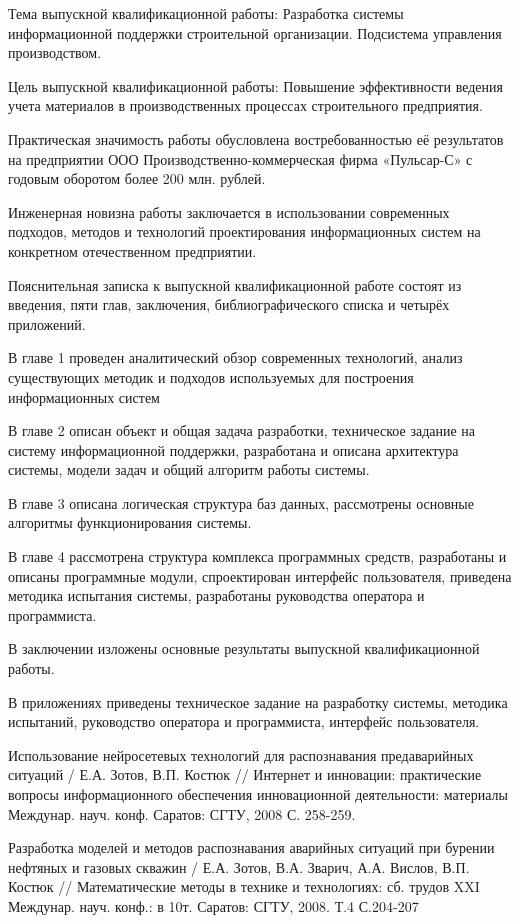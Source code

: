 \documentclass[a4paper,13pt]{article}
\begin{document}
Тема выпускной квалификационной работы:  Разработка системы информационной поддержки строительной организации. Подсистема управления производством.

Цель выпускной квалификационной работы: Повышение эффективности ведения учета материалов в производственных процессах строительного предприятия. 

Практическая значимость работы обусловлена востребованностью её результатов на предприятии ООО Производственно-коммерческая фирма «Пульсар-С» с годовым оборотом более 200 млн. рублей.

Инженерная новизна работы заключается в использовании современных подходов, методов и технологий проектирования информационных систем на конкретном отечественном предприятии.

Пояснительная записка к выпускной квалификационной работе состоят из введения, пяти глав, заключения, библиографического списка и четырёх приложений.

В главе 1 проведен аналитический обзор современных технологий, анализ существующих методик и подходов используемых для построения информационных систем

В главе 2 описан объект и общая задача разработки, техническое задание на систему информационной поддержки, разработана и описана архитектура системы, модели задач и общий алгоритм работы системы.

В главе 3 описана  логическая структура баз данных, рассмотрены основные алгоритмы функционирования системы.

В главе 4 рассмотрена структура комплекса программных средств, разработаны и описаны программные модули, спроектирован интерфейс пользователя,  приведена методика испытания системы, разработаны руководства оператора и программиста.

В заключении изложены основные результаты выпускной квалификационной работы.

В приложениях приведены техническое задание на разработку системы, методика испытаний, руководство оператора и программиста, интерфейс пользователя.
\newpage
\begin{thebibliography}{2}
Использование нейросетевых технологий для распознавания предаварийных ситуаций / Е.А. Зотов, В.П. Костюк // Интернет и инновации: практические вопросы информационного обеспечения инновационной деятельности: материалы Междунар. науч. конф. Саратов: СГТУ, 2008 С. 258-259.

 Разработка моделей и методов распознавания аварийных ситуаций при бурении нефтяных и газовых скважин / Е.А. Зотов, В.А. Зварич, А.А. Вислов, В.П. Костюк // Математические методы в технике и технологиях: сб. трудов XXI Междунар. науч. конф.: в 10т. Саратов: СГТУ, 2008. Т.4 С.204-207
\end{thebibliography}
\end{document}
